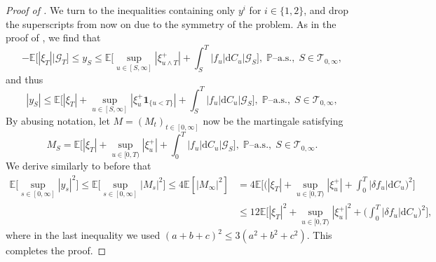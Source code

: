\documentclass[10pt]{article} %
\newcommand\cG{\mathcal G}
\newcommand\cT{\mathcal T}
\def \E{\mathbb{E}}
\def \P{\mathbb{P}}
\newcommand{\1}{\mathbf{1}}
\def\d{\mathrm{d}}
\begin{document}
\begin{proof}[Proof of ]
	\medskip
	We turn to the inequalities containing only $y^i$ for $i \in \{1,2\}$, and drop the superscripts from now on due to the symmetry of the problem. As in the proof of , we find that
	\begin{equation*}
		-\E\big[ |\xi_T| \big| \cG_T\big] \leq y_S \leq \E\bigg[\sup_{u \in [S,\infty]}|\xi^+_{u \land T}| + \int_S^T |f_u|\d C_u \bigg| \cG_S\bigg], \; \text{$\P$--a.s.}, \; S \in \cT_{0,\infty},
	\end{equation*}
	and thus
	\begin{equation*}
		|y_S| \leq \E\bigg[|\xi_T| + \sup_{u \in [S,\infty]}|\xi^+_u \mathbf{1}_{\{u < T\}}| + \int_S^T |f_u|\d C_u \Bigg| \cG_S \bigg], \; \text{$\P$--a.s.}, \; S \in \cT_{0,\infty},
	\end{equation*}
	By abusing notation, let $M = (M_t)_{t \in [0,\infty]}$ now be the martingale satisfying
	\begin{equation*}
		M_S = \E\bigg[|\xi_T| + \sup_{u \in [0,T)}|\xi^+_{u}| + \int_0^T |f_u|\d C_u \bigg| \cG_S \bigg], \; \text{$\P$--a.s.}, \; S \in \cT_{0,\infty}.
	\end{equation*}
	We derive similarly to before that
	\begin{align*}
		\E\bigg[\sup_{s \in [0,\infty]} |y_s|^2\bigg] \leq \E\bigg[\sup_{s \in [0,\infty]} |M_s|^2\bigg] \leq 4  \E[|M_\infty|^2] &= 4  \E\bigg[ \bigg(|\xi_T| + \sup_{u \in [0,T)}|\xi^+_u| + \int_0^T |\delta f_u| \d C_u\bigg)^2 \bigg] \\
		&\leq 12  \E\bigg[ |\xi_T|^2 + \sup_{u \in [0,T)}|\xi^+_u|^2 + \bigg(\int_0^T |\delta f_u| \d C_u\bigg)^2 \bigg],
	\end{align*}
	where in the last inequality we used $(a+b+c)^2 \leq 3(a^2+b^2+c^2)$. This completes the proof.
\end{proof}
\end{document}
